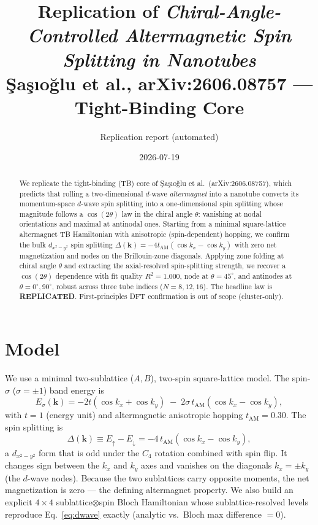 \documentclass[11pt]{article}
\title{Replication of \emph{Chiral-Angle-Controlled Altermagnetic Spin Splitting in Nanotubes}\\
\large \c{S}a\c{s}\i o\u{g}lu et al., arXiv:2606.08757 --- Tight-Binding Core}
\author{Replication report (automated)}
\date{2026-07-19}
\begin{document}
\maketitle

\begin{abstract}
We replicate the tight-binding (TB) core of \c{S}a\c{s}\i o\u{g}lu et al.\ (arXiv:2606.08757),
which predicts that rolling a two-dimensional $d$-wave \emph{altermagnet} into a nanotube
converts its momentum-space $d$-wave spin splitting into a one-dimensional spin splitting whose
magnitude follows a $\cos(2\theta)$ law in the chiral angle $\theta$: vanishing at nodal
orientations and maximal at antinodal ones. Starting from a minimal square-lattice
altermagnet TB Hamiltonian with anisotropic (spin-dependent) hopping, we confirm the bulk
$d_{x^2-y^2}$ spin splitting $\Delta(\mathbf k)=-4t_{\mathrm{AM}}(\cos k_x-\cos k_y)$ with zero
net magnetization and nodes on the Brillouin-zone diagonals. Applying zone folding at chiral
angle $\theta$ and extracting the axial-resolved spin-splitting strength, we recover a
$\cos(2\theta)$ dependence with fit quality $R^2=1.000$, node at $\theta=45^\circ$, and antinodes
at $\theta=0^\circ,90^\circ$, robust across three tube indices ($N=8,12,16$). The headline law is
\textbf{REPLICATED}. First-principles DFT confirmation is out of scope (cluster-only).
\end{abstract}

\section{Model}
We use a minimal two-sublattice ($A,B$), two-spin square-lattice model. The spin-$\sigma$
($\sigma=\pm1$) band energy is
\begin{equation}
E_\sigma(\mathbf k) = -2t(\cos k_x+\cos k_y)\;-\;2\sigma\,t_{\mathrm{AM}}(\cos k_x-\cos k_y),
\end{equation}
with $t=1$ (energy unit) and altermagnetic anisotropic hopping $t_{\mathrm{AM}}=0.30$. The
spin splitting is
\begin{equation}
\Delta(\mathbf k) \equiv E_\uparrow-E_\downarrow = -4\,t_{\mathrm{AM}}(\cos k_x-\cos k_y),
\label{eq:dwave}
\end{equation}
a $d_{x^2-y^2}$ form that is odd under the $C_4$ rotation combined with spin flip. It changes
sign between the $k_x$ and $k_y$ axes and vanishes on the diagonals $k_x=\pm k_y$ (the $d$-wave
nodes). Because the two sublattices carry opposite moments, the net magnetization is zero ---
the defining altermagnet property. We also build an explicit $4\times4$ sublattice$\otimes$spin
Bloch Hamiltonian whose sublattice-resolved levels reproduce Eq.~\eqref{eq:dwave} exactly
(analytic vs.\ Bloch max difference $=0$).
\end{document}
